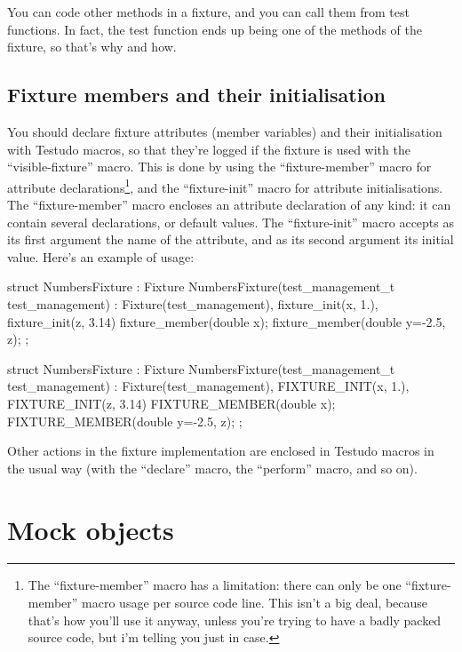 \documentclass[twoside, a4paper, article]{memoir}
\begin{document}
You can code other methods in a fixture, and you can call them from test
functions.  In fact, the test function ends up being one of the methods of the
fixture, so that's why and how.

\section{Fixture members and their initialisation}
\label{sec:fixture-members-and-initialisation}

You should declare fixture attributes (member variables) and their
initialisation with Testudo macros, so that they're logged if the fixture is
used with the ``visible-fixture'' macro.  This is done by using the
``fixture-member'' macro for attribute declarations\footnote{The
  ``fixture-member'' macro has a limitation: there can only be one
  ``fixture-member'' macro usage per source code line.  This isn't a big deal,
  because that's how you'll use it anyway, unless you're trying to have a badly
  packed source code, but i'm telling you just in case.}, and the
``fixture-init'' macro for attribute initialisations.  The ``fixture-member''
macro encloses an attribute declaration of any kind: it can contain several
declarations, or default values.  The ``fixture-init'' macro accepts as its
first argument the name of the attribute, and as its second argument its
initial value.  Here's an example of usage:
\begin{cpplisting}
struct NumbersFixture : Fixture {
  NumbersFixture(test_management_t test_management)
    : Fixture(test_management),
      fixture_init(x, 1.), fixture_init(z, 3.14) { }
  fixture_member(double x);
  fixture_member(double y=-2.5, z);
};
\end{cpplisting}

\begin{cpplisting}
struct NumbersFixture : Fixture
{
  NumbersFixture(test_management_t test_management)
    : Fixture(test_management),
      FIXTURE_INIT(x, 1.),
      FIXTURE_INIT(z, 3.14) { }
  FIXTURE_MEMBER(double x);
  FIXTURE_MEMBER(double y=-2.5, z);
};
\end{cpplisting}

Other actions in the fixture implementation are enclosed in Testudo macros in
the usual way (with the ``declare'' macro, the ``perform'' macro, and so on).


\chapter{Mock objects}
\label{cha:mock-objects}
\end{document}
